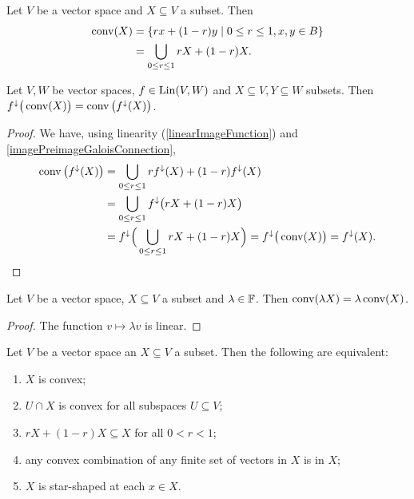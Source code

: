 \begin{lemma} \label{convexHullLemma}
Let $V$ be a vector space and $X\subseteq V$ a subset. Then 
\begin{align*}
\convex(X) &= \setbuilder{rx + (1-r)y}{0\leq r \leq 1, x,y\in B} \\
&= \bigcup_{0\leq r\leq 1} rX + (1-r)X.
\end{align*}
\end{lemma}
\begin{corollary} \label{linearFunctionsPreserveConvexHull}
Let $V,W$ be vector spaces, $f\in \operatorname{Lin}(V,W)$ and $X\subseteq V, Y\subseteq W$ subsets. Then $f^\downarrow\big(\operatorname{conv}(X)\big) = \operatorname{conv}\big(f^\downarrow(X)\big)$.
\end{corollary}
\begin{proof}
We have, using linearity (\ref{linearImageFunction}) and \ref{imagePreimageGaloisConnection},
\begin{align*}
\operatorname{conv}\big(f^\downarrow(X)\big) &= \bigcup_{0\leq r\leq 1}rf^{\downarrow}(X) + (1-r)f^\downarrow(X) \\
&= \bigcup_{0\leq r\leq 1}f^{\downarrow}\big(rX + (1-r)X\big) \\
&= f^{\downarrow}\Big(\bigcup_{0\leq r\leq 1}rX + (1-r)X\Big) = f^{\downarrow}\big(\operatorname{conv}(X)\big) = f^{\downarrow}(X).
\end{align*}
\end{proof}
\begin{corollary} \label{convexHullHomogeneous}
Let $V$ be a vector space, $X\subseteq V$ a subset and $\lambda\in \mathbb{F}$. Then $\operatorname{conv}(\lambda X) = \lambda \operatorname{conv}(X)$.
\end{corollary}
\begin{proof}
The function $v\mapsto \lambda v$ is linear.
\end{proof}

\begin{lemma} \label{convexCriteria}
Let $V$ be a vector space an $X\subseteq V$ a subset. Then the following are equivalent:
\begin{enumerate}
\item $X$ is convex;
\item $U\cap X$ is convex for all subspaces $U\subseteq V$;
\item $rX + (1-r)X \subseteq X$ for all $0< r < 1$;
\item any convex combination of any finite set of vectors in $X$ is in $X$;
\item $X$ is star-shaped at each $x\in X$.
\end{enumerate}
\end{lemma}

